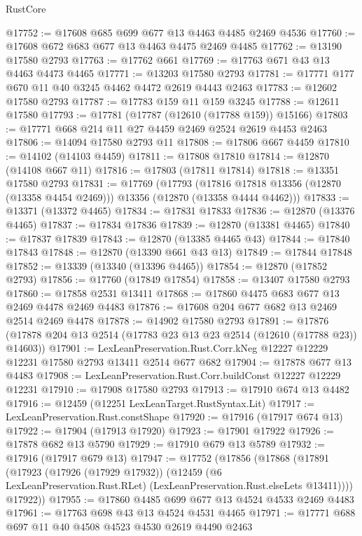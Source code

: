 \begin{lexlean}{RustCore}
\begin{coremodule}
@17752 := @17608 @685 @699 @677 @13 @4463 @4485 @2469 @4536
@17760 := @17608 @672 @683 @677 @13 @4463 @4475 @2469 @4485
@17762 := @13190 @17580 @2793
@17763 := @17762 @661
@17769 := @17763 @671 @43 @13 @4463 @4473 @4465
@17771 := @13203 @17580 @2793
@17781 := @17771 @177 @670 @11 @40 @3245 @4462 @4472 @2619 @4443 @2463
@17783 := @12602 @17580 @2793
@17787 := @17783 @159 @11 @159 @3245
@17788 := @12611 @17580
@17793 := @17781 (@17787 (@12610 (@17788 @159)) @15166)
@17803 := @17771 @668 @214 @11 @27 @4459 @2469 @2524 @2619 @4453 @2463
@17806 := @14094 @17580 @2793 @11
@17808 := @17806 @667 @4459
@17810 := @14102 (@14103 @4459)
@17811 := @17808 @17810
@17814 := @12870 (@14108 @667 @11)
@17816 := @17803 (@17811 @17814)
@17818 := @13351 @17580 @2793
@17831 := @17769
    (@17793
      (@17816 @17818 @13356 (@12870 (@13358 @4454 @2469)))
      @13356
      (@12870 (@13358 @4444 @4462)))
@17833 := @13371 (@13372 @4465)
@17834 := @17831 @17833
@17836 := @12870 (@13376 @4465)
@17837 := @17834 @17836
@17839 := @12870 (@13381 @4465)
@17840 := @17837 @17839
@17843 := @12870 (@13385 @4465 @43)
@17844 := @17840 @17843
@17848 := @12870 (@13390 @661 @43 @13)
@17849 := @17844 @17848
@17852 := @13339 (@13340 (@13396 @4465))
@17854 := @12870 (@17852 @2793)
@17856 := @17760 (@17849 @17854)
@17858 := @13407 @17580 @2793
@17860 := @17858 @2531 @13411
@17868 := @17860 @4475 @683 @677 @13 @2469 @4478 @2469 @4483
@17876 := @17608 @204 @677 @682 @13 @2469 @2514 @2469 @4478
@17878 := @14902 @17580 @2793
@17891 := @17876 (@17878 @204 @13 @2514 (@17783 @23 @13 @23 @2514 (@12610 (@17788 @23)) @14603))
@17901 := LexLeanPreservation.Rust.Corr.kNeg
    @12227
    @12229
    @12231
    @17580
    @2793
    @13411
    @2514
    @677
    @682
@17904 := @17878 @677 @13 @4483
@17908 := LexLeanPreservation.Rust.Corr.buildConst @12227 @12229 @12231
@17910 := @17908 @17580 @2793
@17913 := @17910 @674 @13 @4482
@17916 := @12459 (@12251 LexLeanTarget.RustSyntax.Lit)
@17917 := LexLeanPreservation.Rust.constShape
@17920 := @17916 (@17917 @674 @13)
@17922 := @17904 (@17913 @17920)
@17923 := @17901 @17922
@17926 := @17878 @682 @13 @5790
@17929 := @17910 @679 @13 @5789
@17932 := @17916 (@17917 @679 @13)
@17947 := @17752
    (@17856
      (@17868
        (@17891
          (@17923
            (@17926 (@17929 @17932))
            (@12459 (@6 LexLeanPreservation.Rust.RLet) (LexLeanPreservation.Rust.elseLets @13411))))
        @17922))
@17955 := @17860 @4485 @699 @677 @13 @4524 @4533 @2469 @4483
@17961 := @17763 @698 @43 @13 @4524 @4531 @4465
@17971 := @17771 @688 @697 @11 @40 @4508 @4523 @4530 @2619 @4490 @2463

\end{coremodule}
\end{lexlean}
